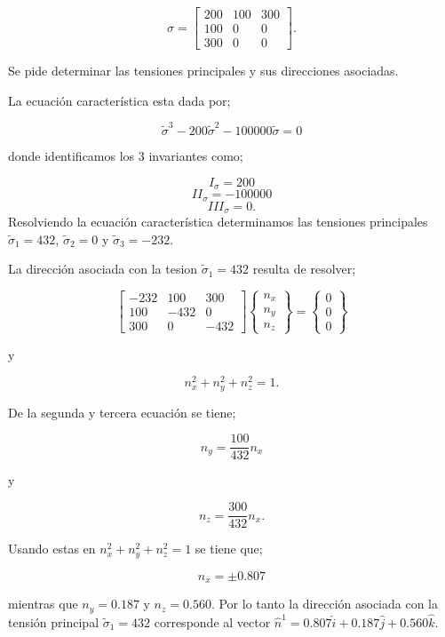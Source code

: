 \documentclass[../notas medios.tex]{subfiles}
\begin{document}
\[\sigma  = \left[ {\begin{array}{*{20}{c}}
{200}&{100}&{300}\\
{100}&0&0\\
{300}&0&0
\end{array}} \right].\]

Se pide determinar las tensiones principales y sus direcciones asociadas.

La ecuación característica esta dada por;

\[{{\tilde \sigma }^3} - 200{{\tilde \sigma }^2} - 100000\tilde \sigma  = 0\]

donde identificamos los 3 invariantes como;


\[{I_\sigma } = 200\]
\[I{I_\sigma } =  - 100000\]
\[II{I_\sigma } = 0.\]
%
Resolviendo la ecuación característica determinamos las tensiones principales ${{\tilde \sigma }_1} = 432$, ${{\tilde \sigma }_2} = 0$ y ${{\tilde \sigma }_3} =  - 232$.

La dirección asociada con la tesion ${{\tilde \sigma }_1} = 432$ resulta de resolver;

\[\left[ {\begin{array}{*{20}{c}}
{ - 232}&{100}&{300}\\
{100}&{ - 432}&0\\
{300}&0&{ - 432}
\end{array}} \right]\left\{ {\begin{array}{*{20}{c}}
{{n_x}}\\
{{n_y}}\\
{{n_z}}
\end{array}} \right\} = \left\{ {\begin{array}{*{20}{c}}
0\\
0\\
0
\end{array}} \right\}\]

y

\[n_x^2 + n_y^2 + n_z^2 = 1.\]

De la segunda y tercera ecuación se tiene;

\[{n_y} = \frac{{100}}{{432}}{n_x}\]

y

\[{n_z} = \frac{{300}}{{432}}{n_x}.\]

Usando estas en $n_x^2 + n_y^2 + n_z^2 = 1$ se tiene que;

\[{n_x} =  \pm 0.807\]

mientras que ${n_y} = 0.187$ y ${n_z} = 0.560$. Por lo tanto la dirección asociada con la tensión principal ${{\tilde \sigma }_1} = 432$ corresponde al vector ${{\hat n}^1} = 0.807\hat i + 0.187\hat j + 0.560\hat k$.
\end{document}
